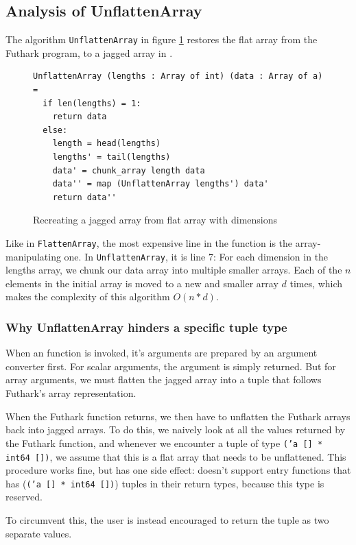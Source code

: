 \subsection{Analysis of UnflattenArray}
The algorithm \texttt{UnflattenArray} in figure \ref{fig:unflattenarray}
restores the flat array from the Futhark \csharp{} program, to a jagged array in \fsharp{}.

\begin{figure}[H]
  \centering
\begin{verbatim}
UnflattenArray (lengths : Array of int) (data : Array of a) =
  if len(lengths) = 1:
    return data
  else:
    length = head(lengths)
    lengths' = tail(lengths)
    data' = chunk_array length data 
    data'' = map (UnflattenArray lengths') data'
    return data''
\end{verbatim}
  \caption{Recreating a jagged array from flat array with dimensions}
  \label{fig:unflattenarray}
\end{figure}

Like in \texttt{FlattenArray}, the most expensive line in the function is the
array-manipulating one. In \texttt{UnflattenArray}, it is line 7: For each
dimension in the lengths array, we chunk our data array into multiple smaller
arrays. Each of the $n$ elements in the initial array is moved to a new and smaller array
$d$ times, which makes the complexity of this algorithm $O(n*d)$.

\subsubsection*{Why UnflattenArray hinders a specific tuple type}
When an \fshark{} function is invoked, it's arguments are prepared by an
argument converter first. For scalar arguments, the argument is simply returned.
But for array arguments, we must flatten the jagged array into a tuple that
follows Futhark's array representation.

When the Futhark function returns, we then have to unflatten the Futhark arrays
back into jagged arrays. To do this, we naively look at all the values
returned by the Futhark function, and whenever we encounter a tuple of type
\texttt{('a [] * int64 [])}, we assume that this is a flat array that needs to
be unflattened.
This procedure works fine, but has one side effect: \fshark{} doesn't support
entry functions that has (\texttt{('a [] * int64 [])}) tuples in their return
types, because this type is reserved.

To circumvent this, the user is instead encouraged to return the tuple as two
separate values.

